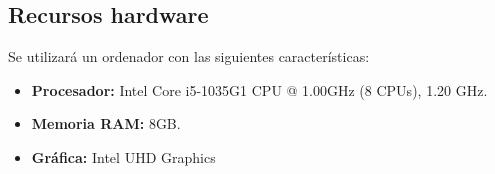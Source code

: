 \vspace{-0.15cm}

\subsection{Recursos hardware}
Se utilizará un ordenador con las siguientes características:
\begin{itemize}
    \item \textbf{Procesador:} Intel\textregistered{} Core\texttrademark{} i5-1035G1 CPU @ 1.00GHz (8 CPUs), 1.20 GHz.
    \item \textbf{Memoria RAM:} 8GB.
    \item \textbf{Gráfica:} Intel\textregistered{} UHD Graphics
\end{itemize}


